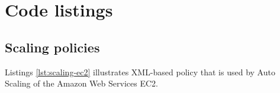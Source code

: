 \chapter{Code listings}

\section{Scaling policies}
\label{app:scaling-policies}

Listings \ref{lst:scaling-ec2} illustrates XML-based policy that is used by Auto Scaling of the Amazon Web Services EC2.


